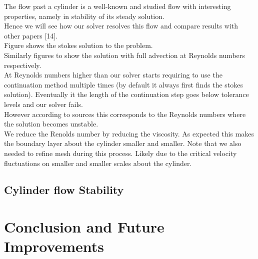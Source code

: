 \documentclass[11pt,twoside,a4paper]{article}
\begin{document}
The flow past a cylinder is a well-known and studied flow with interesting properties, namely in stability of its steady solution.\\
Hence we will see how our solver resolves this flow and compare results with other papers [14].\\

Figure shows the stokes solution to the problem.\\
Similarly figures to show the solution with full advection at Reynolds numbers respectively.\\
At Reynolds numbers higher than our solver starts requiring to use the continuation method multiple times (by default it always first finds the stokes solution). Eventually it the length of the continuation step goes below tolerance levels and our solver fails.\\
However according to sources this corresponds to the Reynolds numbers where the solution becomes unstable.\\
We reduce the Renolds number by reducing the viscosity. As expected this makes the boundary layer about the cylinder smaller and smaller. Note that we also needed to refine mesh during this process. Likely due to the critical velocity fluctuations on smaller and smaller scales about the cylinder.

\subsection{Cylinder flow Stability}

\section{Conclusion and Future Improvements}
\end{document}
